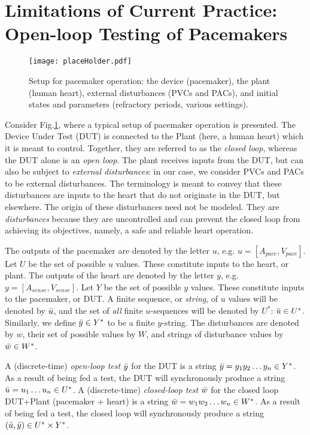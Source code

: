\section{Limitations of Current Practice: Open-loop Testing of Pacemakers}
\label{todaysPractice}
\begin{figure}[tb]
	\centering
	\texttt{[image: placeHolder.pdf]}
	\caption{Setup for pacemaker operation: the device (pacemaker), the plant (human heart), external disturbances (PVCs and PACs), and initial states and parameters (refractory periods, various settings).}
	\label{fig:liveSetup}
\end{figure}
Consider Fig.\ref{fig:liveSetup}, where a typical setup of pacemaker operation is presented.
The Device Under Test (DUT) is connected to the Plant (here, a human heart) which it is meant to control.
Together, they are referred to as the \emph{closed loop}, whereas the DUT alone is an \emph{open loop}.
The plant receives inputs from the DUT, but can also be subject to \emph{external disturbances}: in our case, we consider PVCs and PACs to be external disturbances.
The terminology is meant to convey that these disturbances are inputs to the heart that do not originate in the DUT, but elsewhere. 
The origin of these disturbances need not be modeled.  
They are \emph{disturbances} because they are uncontrolled and can prevent the closed loop from achieving its objectives, namely, a safe and reliable heart operation.

The outputs of the pacemaker are denoted by the letter $u$, e.g. $u = [A_{pace}, V_{pace}]$.
Let $U$ be the set of possible $u$ values.
These constitute inputs to the heart, or plant.
The outputs of the heart are denoted by the letter $y$, e.g. $y = [A_{sense}, V_{sense}]$.
Let $Y$ be the set of possible $y$ values.
These constitute inputs to the pacemaker, or DUT.
A finite sequence, or \emph{string}, of $u$ values will be denoted by $\bar{u}$, and the set of \emph{all} finite $u$-sequences will be denoted by $U^*$: $\bar{u} \in U^*$.
Similarly, we define $\bar{y} \in Y^*$ to be a finite $y$-string.
The disturbances are denoted by $w$, their set of possible values by $W$, and strings of disturbance values by $\bar{w} \in W^*$.

A (discrete-time) \emph{open-loop test} $\bar{y}$ for the DUT is a string $\bar{y} = y_1 y_2 \ldots y_n \in Y^*$.
As a result of being fed a test, the DUT will synchronously produce a string $\bar{u} = u_1 \ldots u_n \in U^*$.
A (discrete-time) \emph{closed-loop test} $\bar{w}$ for the closed loop DUT+Plant (pacemaker + heart) is a string $\bar{w} = w_1 w_2 \ldots w_n \in W^*$.
As a result of being fed a test, the closed loop will synchronously produce a string $(\bar{u},\bar{y}) \in U^* \times Y^*$.

